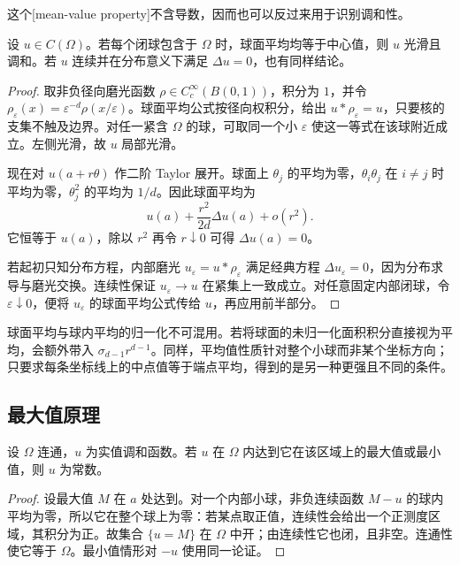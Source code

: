 这个[mean-value property]不含导数，因而也可以反过来用于识别调和性。

\begin{proposition}[平均值性质的逆命题]\label{b2:prop:13-converse-mean}
设 \(u\in C(\Omega)\)。若每个闭球包含于 \(\Omega\) 时，球面平均均等于中心值，则 \(u\) 光滑且调和。若 \(u\) 连续并在分布意义下满足 \(\Delta u=0\)，也有同样结论。
\end{proposition}
\begin{proof}
取非负径向磨光函数 \(\rho\in C_c^\infty(B(0,1))\)，积分为 \(1\)，并令 \(\rho_\varepsilon(x)=\varepsilon^{-d}\rho(x/\varepsilon)\)。球面平均公式按径向权积分，给出 \(u*\rho_\varepsilon=u\)，只要核的支集不触及边界。对任一紧含 \(\Omega\) 的球，可取同一个小 \(\varepsilon\) 使这一等式在该球附近成立。左侧光滑，故 \(u\) 局部光滑。

现在对 \(u(a+r\theta)\) 作二阶 Taylor 展开。球面上 \(\theta_j\) 的平均为零，\(\theta_i\theta_j\) 在 \(i\ne j\) 时平均为零，\(\theta_j^2\) 的平均为 \(1/d\)。因此球面平均为
\[
 u(a)+\dfrac{r^2}{2d}\Delta u(a)+o(r^2).
\]
它恒等于 \(u(a)\)，除以 \(r^2\) 再令 \(r\downarrow0\) 可得 \(\Delta u(a)=0\)。

若起初只知分布方程，内部磨光 \(u_\varepsilon=u*\rho_\varepsilon\) 满足经典方程 \(\Delta u_\varepsilon=0\)，因为分布求导与磨光交换。连续性保证 \(u_\varepsilon\to u\) 在紧集上一致成立。对任意固定内部闭球，令 \(\varepsilon\downarrow0\)，便将 \(u_\varepsilon\) 的球面平均公式传给 \(u\)，再应用前半部分。
\end{proof}

球面平均与球内平均的归一化不可混用。若将球面的未归一化面积积分直接视为平均，会额外带入 \(\sigma_{d-1}r^{d-1}\)。同样，平均值性质针对整个小球而非某个坐标方向；只要求每条坐标线上的中点值等于端点平均，得到的是另一种更强且不同的条件。

\subsection{最大值原理}
\label{b2:subsec:130102}

\begin{theorem}[调和函数的强最大值原理]\label{b2:thm:13-strong-maximum}
设 \(\Omega\) 连通，\(u\) 为实值调和函数。若 \(u\) 在 \(\Omega\) 内达到它在该区域上的最大值或最小值，则 \(u\) 为常数。
\end{theorem}
\begin{proof}
设最大值 \(M\) 在 \(a\) 处达到。对一个内部小球，非负连续函数 \(M-u\) 的球内平均为零，所以它在整个球上为零：若某点取正值，连续性会给出一个正测度区域，其积分为正。故集合 \(\{u=M\}\) 在 \(\Omega\) 中开；由连续性它也闭，且非空。连通性使它等于 \(\Omega\)。最小值情形对 \(-u\) 使用同一论证。
\end{proof}

